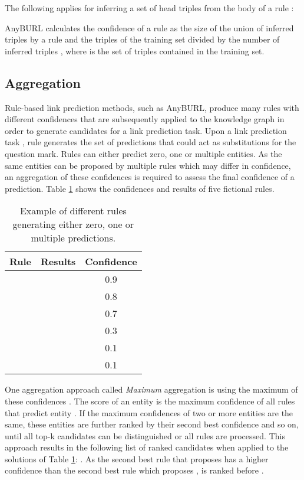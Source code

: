 \documentclass[akbc,twoside,11pt,lettersize]{article}
\begin{document}
The following applies for inferring a set of head triples  from the body of a rule :


AnyBURL calculates the confidence of a rule as the size of the union of inferred triples by a rule and the triples of the training set divided by the number of inferred triples , where  is the set of triples contained in the training set.












\subsection{Aggregation}

Rule-based link prediction methods, such as AnyBURL, produce many rules with different confidences that are subsequently applied to the knowledge graph in order to generate candidates for a link prediction task. Upon a link prediction task , rule  generates the set of predictions  that could act as substitutions for the question mark. Rules can either predict zero, one or multiple entities. As the same entities can be proposed by multiple rules which may differ in confidence, an aggregation of these confidences is required to assess the final confidence of a prediction. Table \ref{exSol} shows the confidences and results of five fictional rules.

\begin{table}[h]
\centering
\begin{tabular}{ccc}
\hline
    Rule & Results & Confidence \\ \hline
	 &  & 0.9 \\ \hline
	 &  & 0.8 \\ \hline
	 &  & 0.7 \\ \hline
	 &  & 0.3 \\ \hline
	 &  & 0.1 \\ \hline
	 &  & 0.1 \\ \hline
\end{tabular}
\caption{Example of different rules generating either zero, one or multiple predictions. }
\label{exSol}
\end{table}

One aggregation approach called \textit{Maximum} aggregation is using the maximum of these confidences \cite{meilicke_2019}. The score of an entity 
is the maximum confidence of all rules  that predict entity . If the maximum confidences of two or more entities are the same, these entities are further ranked by their second best confidence and so on, until all top-k candidates can be distinguished or  all rules are processed. This approach results in the following list of ranked candidates when applied to the solutions of Table \ref{exSol}: . As the second best rule that proposes  has a higher confidence than the second best rule which proposes ,  is ranked before .
\end{document}
